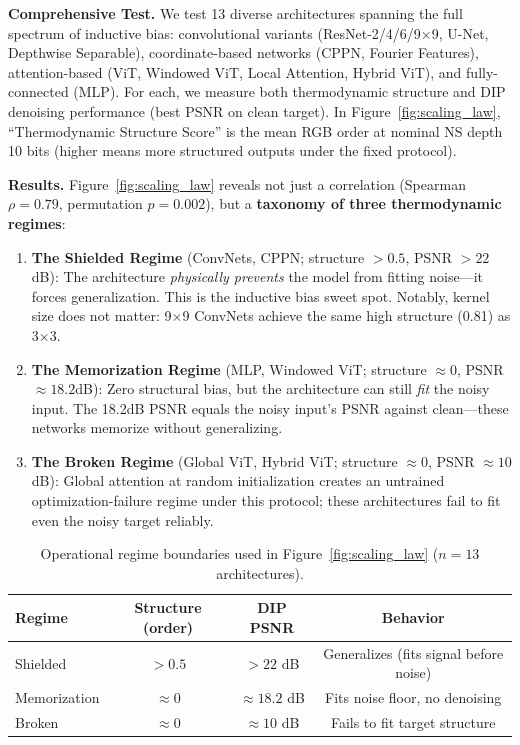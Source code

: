\documentclass{article}
\begin{document}
\textbf{Comprehensive Test.} We test 13 diverse architectures spanning the full spectrum of inductive bias: convolutional variants (ResNet-2/4/6/9$\times$9, U-Net, Depthwise Separable), coordinate-based networks (CPPN, Fourier Features), attention-based (ViT, Windowed ViT, Local Attention, Hybrid ViT), and fully-connected (MLP). For each, we measure both thermodynamic structure and DIP denoising performance (best PSNR on clean target). In Figure~\ref{fig:scaling_law}, ``Thermodynamic Structure Score'' is the mean RGB order at nominal NS depth 10 bits (higher means more structured outputs under the fixed protocol).

\textbf{Results.} Figure~\ref{fig:scaling_law} reveals not just a correlation (Spearman $\rho = 0.79$, permutation $p = 0.002$), but a \textbf{taxonomy of three thermodynamic regimes}:

\begin{enumerate}
    \item \textbf{The Shielded Regime} (ConvNets, CPPN; structure $> 0.5$, PSNR $> 22$dB): The architecture \emph{physically prevents} the model from fitting noise---it forces generalization. This is the inductive bias sweet spot. Notably, kernel size does not matter: 9$\times$9 ConvNets achieve the same high structure (0.81) as 3$\times$3.

    \item \textbf{The Memorization Regime} (MLP, Windowed ViT; structure $\approx 0$, PSNR $\approx 18.2$dB): Zero structural bias, but the architecture can still \emph{fit} the noisy input. The 18.2dB PSNR equals the noisy input's PSNR against clean---these networks memorize without generalizing.

    \item \textbf{The Broken Regime} (Global ViT, Hybrid ViT; structure $\approx 0$, PSNR $\approx 10$dB): Global attention at random initialization creates an untrained optimization-failure regime under this protocol; these architectures fail to fit even the noisy target reliably.
\end{enumerate}

\begin{table}[H]
\centering
\caption{Operational regime boundaries used in Figure~\ref{fig:scaling_law} ($n=13$ architectures).}
\label{tab:regime_boundaries}
\begin{tabular}{lccc}
\toprule
Regime & Structure (order) & DIP PSNR & Behavior \\
\midrule
Shielded & $> 0.5$ & $> 22$ dB & Generalizes (fits signal before noise) \\
Memorization & $\approx 0$ & $\approx 18.2$ dB & Fits noise floor, no denoising \\
Broken & $\approx 0$ & $\approx 10$ dB & Fails to fit target structure \\
\bottomrule
\end{tabular}
\end{table}
\end{document}
